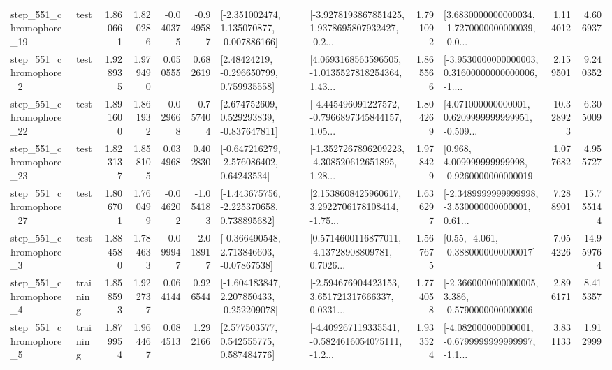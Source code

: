 \begin{tabular}{llrrrrllrlrr}
  step\_551\_chromophore\_19 &      test &      1.860661 &    1.820286 &     -0.040375 & -0.949587 &   [-2.351002474, 1.135070877, -0.007886166] &  [-3.9278193867851425, 1.9378695807932427, -0.2... &       1.791092 &  [3.6830000000000034, -1.7270000000000039, -0.0... &            1.114012 &          4.606937 \\
   step\_551\_chromophore\_2 &      test &      1.928935 &    1.979490 &      0.050555 &  0.682619 &     [2.48424219, -0.296650799, 0.759935558] &  [4.0693168563596505, -1.0135527818254364, 1.43... &       1.865566 &  [-3.9530000000000003, 0.31600000000000006, -1.... &            2.159501 &          9.240352 \\
  step\_551\_chromophore\_22 &      test &      1.891600 &    1.861932 &     -0.029668 & -0.757404 &    [2.674752609, 0.529293839, -0.837647811] &  [-4.445496091227572, -0.7966897345844157, 1.05... &       1.804269 &  [4.071000000000001, 0.6209999999999951, -0.509... &           10.328923 &          6.305009 \\
  step\_551\_chromophore\_23 &      test &      1.823137 &    1.858105 &      0.034968 &  0.402830 &    [-0.647216279, -2.576086402, 0.64243534] &  [-1.3527267896209223, -4.308520612651895, 1.28... &       1.978429 &    [0.968, 4.009999999999998, -0.9260000000000019] &            1.077682 &          4.955727 \\
  step\_551\_chromophore\_27 &      test &      1.806701 &    1.760499 &     -0.046202 & -1.054183 &   [-1.443675756, -2.225370658, 0.738895682] &  [2.1538608425960617, 3.2922706178108414, -1.75... &       1.636297 &  [-2.3489999999999998, -3.530000000000001, 0.61... &            7.288901 &         15.755144 \\
   step\_551\_chromophore\_3 &      test &      1.884580 &    1.784633 &     -0.099947 & -2.018917 &    [-0.366490548, 2.713846603, -0.07867538] &  [0.5714600116877011, -4.13728908809781, 0.7026... &       1.567675 &                [0.55, -4.061, -0.3880000000000017] &            7.054226 &         14.959764 \\
   step\_551\_chromophore\_4 &  training &      1.858593 &    1.922737 &      0.064144 &  0.926544 &   [-1.604183847, 2.207850433, -0.252209078] &  [-2.594676904423153, 3.651721317666337, 0.0331... &       1.774058 &  [-2.3660000000000005, 3.386, -0.5790000000000006] &            2.896171 &          8.415357 \\
   step\_551\_chromophore\_5 &  training &      1.879954 &    1.964467 &      0.084513 &  1.292166 &     [2.577503577, 0.542555775, 0.587484776] &  [-4.409267119335541, -0.5824616054075111, -1.2... &       1.933524 &  [-4.082000000000001, -0.6799999999999997, -1.1... &            3.831133 &          1.912999 \\

\end{tabular}
